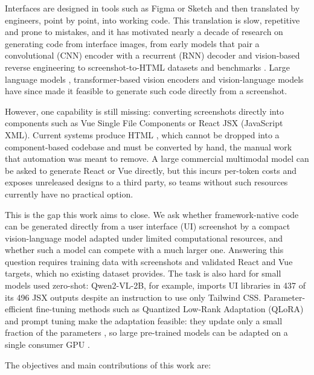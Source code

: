 \documentclass[conference,a4paper]{IEEEtran}
\begin{document}
Interfaces are designed in tools such as Figma or Sketch and then translated by
engineers, point by point, into working code. This
translation is slow, repetitive and prone to mistakes, and it has motivated
nearly a decade of research on generating code from interface images, from
early models that pair a convolutional (CNN) encoder with a recurrent (RNN) decoder
\cite{beltramelli2017pix2code} and vision-based reverse
engineering \cite{nguyen2015reverse} to screenshot-to-HTML datasets and
benchmarks \cite{laurencon2024unlocking, si2025design2code}. Large language
models \cite{brown2020gpt3, chen2021codex, openai2023gpt4}, transformer-based
vision encoders \cite{vaswani2017attention, dosovitskiy2020vit, radford2021clip}
and vision-language models \cite{alayrac2022flamingo, lee2023pix2struct} have
since made it feasible to generate such code directly from a screenshot.

However, one capability is still missing: converting screenshots directly into
components such as Vue Single File Components or React JSX (JavaScript XML). Current systems
produce HTML \cite{si2025design2code, yun2024web2code, gui2025webcode2m}, which
cannot be dropped into a component-based codebase and must be converted by hand,
the manual work that automation was meant to remove. A large commercial
multimodal model can be asked to generate React or Vue directly, but this incurs
per-token costs and exposes unreleased designs to a third party, so teams
without such resources currently have no practical option.

This is the gap this work aims to close. We ask whether framework-native code can
be generated directly from a user interface (UI) screenshot by a compact
vision-language model adapted under limited computational resources, and whether
such a model can compete with a much larger one. Answering this question requires
training data with screenshots and validated React and Vue targets, which no
existing dataset provides. The task is also hard for small models used
zero-shot: Qwen2-VL-2B, for example, imports UI libraries in 437 of its 496 JSX
outputs despite an instruction to use only Tailwind CSS.
Parameter-efficient fine-tuning methods such as Quantized Low-Rank Adaptation (QLoRA) \cite{dettmers2023qlora}
and prompt tuning \cite{lester2021power} make the adaptation feasible: they
update only a small fraction of the parameters \cite{han2024peftsurvey}, so large
pre-trained models can be adapted on a single consumer GPU \cite{hu2021lora, dettmers2023qlora}.

The objectives and main contributions of this work are:
\end{document}
